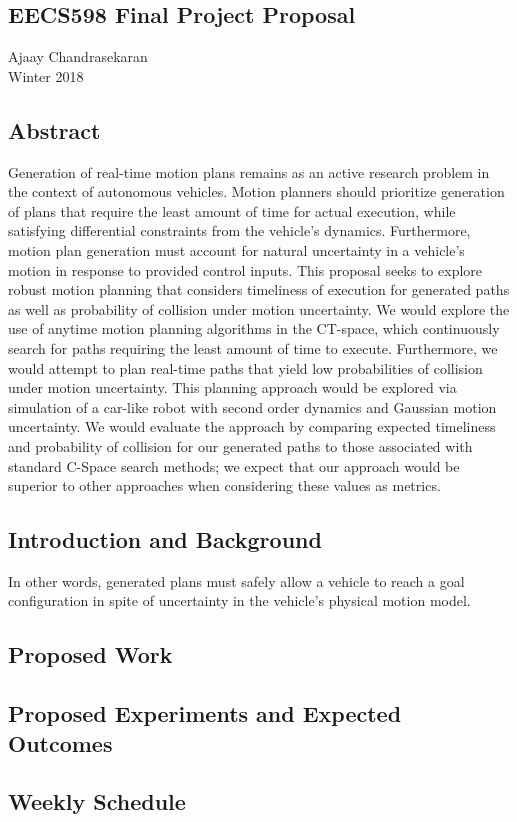\documentclass[12pt]{article}
\begin{document}
\begin{center}
\section*{EECS598 Final Project Proposal}
Ajaay Chandrasekaran\\
Winter 2018
\end{center}

\subsection*{Abstract}
Generation of real-time motion plans remains as an active research problem in the context of autonomous vehicles. Motion planners should prioritize generation of plans that require the least amount of time for actual execution, while satisfying differential constraints from the vehicle's dynamics. Furthermore, motion plan generation must account for natural uncertainty in a vehicle's motion in response to provided control inputs. This proposal seeks to explore robust motion planning that considers timeliness of execution for generated paths as well as probability of collision under motion uncertainty. We would explore the use of anytime motion planning algorithms in the CT-space, which continuously search for paths requiring the least amount of time to execute. Furthermore, we would attempt to plan real-time paths that yield low probabilities of collision under motion uncertainty. This planning approach would be explored via simulation of a car-like robot with second order dynamics and Gaussian motion uncertainty. We would evaluate the approach by comparing expected timeliness and probability of collision for our generated paths to those associated with standard C-Space search methods; we expect that our approach would be superior to other approaches when considering these values as metrics.

\subsection*{Introduction and Background}
In other words, generated plans must safely allow a vehicle to reach a goal configuration in spite of uncertainty in the vehicle's physical motion model.

\subsection*{Proposed Work}

\subsection*{Proposed Experiments and Expected Outcomes}

\subsection*{Weekly Schedule}
\end{document}
